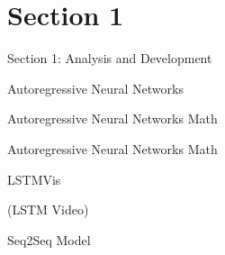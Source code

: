 
\section{Section 1}


\begin{frame}{Section 1: Analysis and Development}

\end{frame}


\begin{frame}{Autoregressive Neural Networks}
  \vspace{-0.25cm}

  \begin{center}
  \end{center}
\end{frame}


\begin{frame}{Autoregressive Neural Networks Math}
  \vspace{-0.25cm}

  \begin{center}
  \end{center}
\end{frame}


\begin{frame}{Autoregressive Neural Networks Math}
  \vspace{-0.25cm}

  \begin{center}
  \end{center}
\end{frame}

\begin{frame}{LSTMVis}

  (LSTM Video)


\end{frame}

\begin{frame}{Seq2Seq Model}
  \vspace{-0.25cm}

  \begin{center}
  \end{center}
\end{frame}

